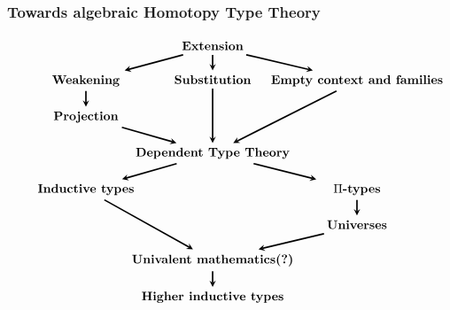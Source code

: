 \documentclass[handout]{beamer}
\begin{document}
\begin{frame}
\frametitle{\bf Towards algebraic Homotopy Type Theory}
\begin{footnotesize}
\begin{equation*}
\begin{tikzcd}[ampersand replacement=\&,column sep=0em,row sep=1.3em]
 {}\& 
\textbf{Extension} 
  \ar[very thick,-stealth]{dr} 
  \ar[very thick,-stealth]{d} 
  \ar[very thick,-stealth]{dl}
  \\
\makebox[2cm]{\textbf{Weakening}} 
  \ar[very thick,-stealth]{d} 
  \& 
\textbf{Substitution} 
  \ar[very thick,-stealth]{dd} 
  \& 
\makebox[3cm]{\textbf{Empty context and families}} 
  \ar[very thick,-stealth]{ddl}
  \\
\makebox[2cm]{\textbf{Projection}} 
  \ar[very thick,-stealth]{dr}
  \\
  {}\& 
\textbf{Dependent Type Theory}
  \ar[very thick,-stealth]{dr}
  \ar[very thick,-stealth]{dl}
  \\
\makebox[2cm]{\bf Inductive types}
  \ar[very thick,-stealth]{ddr}
  \&\&
\makebox[2cm]{\bf $\Pi$-types}
  \ar[very thick,-stealth]{d}
  \\
  {}\&
  {}\&
\makebox[2cm]{\bf Universes}
  \ar[very thick,-stealth]{dl}
  \\
  {}\&
\mbox{\bf Univalent mathematics(?)}
  \ar[very thick,-stealth]{d}
  \\
  {}\&
\mbox{\bf Higher inductive types}
\end{tikzcd}
\end{equation*}
\end{footnotesize}
\end{frame}
\end{document}
